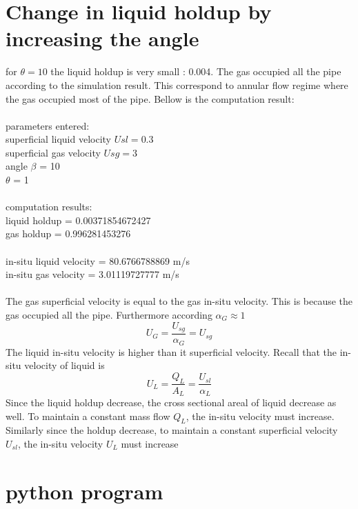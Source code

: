 \documentclass[10pt,a4paper]{report}
\begin{document}
\section{Change in liquid holdup by increasing the angle}
for $\theta = 10$ the liquid holdup is very small : 0.004. The gas occupied all the pipe according to the simulation result. This correspond to annular flow regime where the gas occupied most of the pipe. Bellow is the computation result:\\
\\
parameters entered:\\
superficial liquid velocity $Usl =  0.3$\\
superficial gas velocity $Usg    =  3$\\
angle $\beta$                      =  10\\
$\theta$                           =  1\\
\\
computation results:\\
liquid holdup             = 0.00371854672427\\
gas holdup                = 0.996281453276\\
\\
in-situ liquid velocity   = 80.6766788869 m/s\\
in-situ gas velocity      = 3.01119727777 m/s\\
\\
The gas superficial velocity is equal to the gas in-situ velocity. This is because the gas occupied all the pipe. Furthermore according $\alpha_{G} \approx 1$ 
\begin{equation}
U_{G} = \frac{U_{sg}}{\alpha_{G}}=U_{sg} \nonumber
\end{equation}
The liquid in-situ velocity is higher than it superficial velocity. Recall that the in-situ velocity of liquid is
\begin{equation}
U_{L} = \frac{Q_{L}}{A_{L}} = \frac{U_{sl}}{\alpha_{L}}\nonumber
\end{equation}
Since the liquid holdup decrease, the cross sectional areal of liquid decrease as well. To maintain a constant mass flow $Q_{L}$, the in-situ velocity must increase. Similarly since the holdup decrease, to maintain a constant superficial velocity $U_{sl}$, the in-situ velocity $U_{L}$ must increase





\section{python program}
\end{document}
